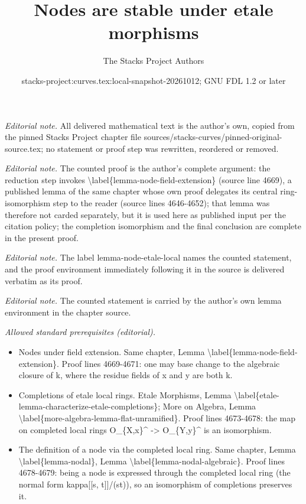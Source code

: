 \documentclass[10pt,a4paper]{amsart}
\title{Nodes are stable under etale morphisms}
\author{The Stacks Project Authors}
\date{stacks-project:curves.tex:local-snapshot-20261012; GNU FDL 1.2 or later}
\theoremstyle{plain}
\theoremstyle{definition}
\theoremstyle{remark}
\numberwithin{equation}{subsection}
\begin{document}
\maketitle
\noindent\textit{Editorial note.} All delivered mathematical text is the author's own, copied from the pinned Stacks Project chapter file sources/stacks-curves/pinned-original-source.tex; no statement or proof step was rewritten, reordered or removed.\par\medskip
\noindent\textit{Editorial note.} The counted proof is the author's complete argument: the reduction step invokes \textbackslash{}label\{lemma-node-field-extension\} (source line 4669), a published lemma of the same chapter whose own proof delegates its central ring-isomorphism step to the reader (source lines 4646-4652); that lemma was therefore not carded separately, but it is used here as published input per the citation policy; the completion isomorphism and the final conclusion are complete in the present proof.\par\medskip
\noindent\textit{Editorial note.} The label lemma-node-etale-local names the counted statement, and the proof environment immediately following it in the source is delivered verbatim as its proof.\par\medskip
\noindent\textit{Editorial note.} The counted statement is carried by the author's own lemma environment in the chapter source.\par\medskip
\noindent\textit{Allowed standard prerequisites (editorial).}\begin{itemize}
\item Nodes under field extension. Same chapter, Lemma \textbackslash{}label\{lemma-node-field-extension\}. Proof lines 4669-4671: one may base change to the algebraic closure of k, where the residue fields of x and y are both k.
\item Completions of etale local rings. Etale Morphisms, Lemma \textbackslash{}label\{etale-lemma-characterize-etale-completions\}; More on Algebra, Lemma \textbackslash{}label\{more-algebra-lemma-flat-unramified\}. Proof lines 4673-4678: the map on completed local rings O\_\{X,x\}\textasciicircum{} -> O\_\{Y,y\}\textasciicircum{} is an isomorphism.
\item The definition of a node via the completed local ring. Same chapter, Lemma \textbackslash{}label\{lemma-nodal\}, Lemma \textbackslash{}label\{lemma-nodal-algebraic\}. Proof lines 4678-4679: being a node is expressed through the completed local ring (the normal form kappa[[s, t]]/(st)), so an isomorphism of completions preserves it.
\end{itemize}\medskip
\end{document}
